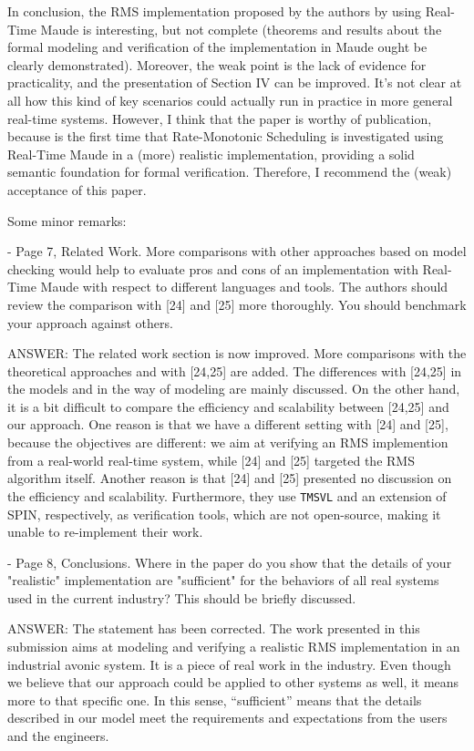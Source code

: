 \documentclass[10pt,journal]{IEEEtran}
\begin{document}
In conclusion, the RMS implementation proposed by the authors by using
Real-Time Maude is interesting, but not complete (theorems and results
about the formal modeling and verification of the implementation in
Maude ought be clearly demonstrated). Moreover, the weak point is the
lack of evidence for practicality, and the presentation of Section IV
can be improved. It's not clear at all how this kind of key scenarios
could actually run in practice in more general real-time
systems. However, I think that the paper is worthy of publication,
because is the first time that Rate-Monotonic Scheduling is
investigated using Real-Time Maude in a (more) realistic
implementation, providing a solid semantic foundation for formal
verification. Therefore, I recommend the (weak) acceptance of this
paper.

Some minor remarks:

- Page 7, Related Work. More comparisons with other approaches based
on model checking would help to evaluate pros and cons of an
implementation with Real-Time Maude with respect to different
languages and tools. The authors should review the comparison with
[24] and [25] more thoroughly. You should benchmark your approach
against others.

ANSWER: The related work section is now improved. More comparisons
with the theoretical approaches and with [24,25] are added. The
differences with [24,25] in the models and in the way of modeling are
mainly discussed. On the other hand, it is a bit difficult to compare
the efficiency and scalability between [24,25] and our approach. One
reason is that we have a different setting with [24] and [25], because
the objectives are different: we aim at verifying an RMS implemention
from a real-world real-time system, while [24] and [25] targeted the
RMS algorithm itself. Another reason is that [24] and [25] presented
no discussion on the efficiency and scalability. Furthermore, they use
\verb|TMSVL| and an extension of SPIN, respectively, as verification
tools, which are not open-source, making it unable to re-implement
their work.

- Page 8, Conclusions. Where in the paper do you show that the details
of your "realistic" implementation are "sufficient" for the behaviors
of all real systems used in the current industry? This should be
briefly discussed.

ANSWER: The statement has been corrected. The work presented in this
submission aims at modeling and verifying a realistic RMS
implementation in an industrial avonic system. It is a piece of real
work in the industry. Even though we believe that our approach could
be applied to other systems as well, it means more to that specific
one. In this sense, ``sufficient'' means that the details described in
our model meet the requirements and expectations from the users and
the engineers.
\end{document}
